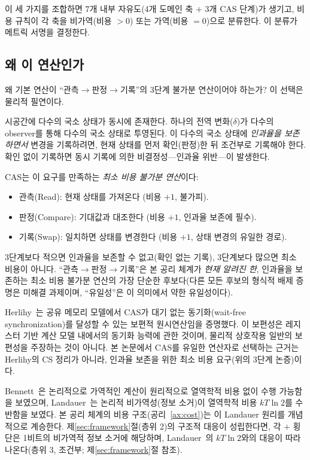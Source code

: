 \documentclass[entropy,article,submit,pdftex,oneauthor]{Definitions/mdpi}
\begin{document}
이 세 가지를 조합하면 7개 내부 자유도(4개 도메인 축 $+$ 3개 CAS 단계)가 생기고, 비용 규칙이 각 축을 비가역(비용 $> 0$) 또는 가역(비용 $= 0$)으로 분류한다. 이 분류가 메트릭 서명을 결정한다.

\subsection{왜 이 연산인가}

왜 기본 연산이 ``관측$\to$판정$\to$기록''의 3단계 불가분 연산이어야 하는가? 이 선택은 물리적 필연이다.

시공간에 다수의 국소 상태가 동시에 존재한다. 하나의 전역 변화($\delta$)가 다수의 observer를 통해 다수의 국소 상태로 투영된다. 이 다수의 국소 상태에 \emph{인과율을 보존하면서} 변경을 기록하려면, 현재 상태를 먼저 확인(판정)한 뒤 조건부로 기록해야 한다. 확인 없이 기록하면 동시 기록에 의한 비결정성---인과율 위반---이 발생한다.

CAS는 이 요구를 만족하는 \emph{최소 비용 불가분 연산}이다:
\begin{itemize}
\item 관측(Read): 현재 상태를 가져온다 (비용 $+1$, 불가피).
\item 판정(Compare): 기대값과 대조한다 (비용 $+1$, 인과율 보존에 필수).
\item 기록(Swap): 일치하면 상태를 변경한다 (비용 $+1$, 상태 변경의 유일한 경로).
\end{itemize}
3단계보다 적으면 인과율을 보존할 수 없고(확인 없는 기록), 3단계보다 많으면 최소 비용이 아니다. ``관측$\to$판정$\to$기록''은 본 공리 체계가 \emph{현재 알려진 한}, 인과율을 보존하는 최소 비용 불가분 연산의 가장 단순한 후보다(다른 모든 후보의 형식적 배제 증명은 미해결 과제이며, ``유일성''은 이 의미에서 약한 유일성이다).

Herlihy~\cite{herlihy1991}는 공유 메모리 모델에서 CAS가 대기 없는 동기화(wait-free synchronization)를 달성할 수 있는 보편적 원시연산임을 증명했다. 이 보편성은 레지스터 기반 계산 모델 내에서의 동기화 능력에 관한 것이며, 물리적 상호작용 일반의 보편성을 주장하는 것이 아니다. 본 논문에서 CAS를 유일한 연산자로 선택하는 근거는 Herlihy의 CS 정리가 아니라, 인과율 보존을 위한 최소 비용 요구(위의 3단계 논증)이다.

Bennett~\cite{bennett1973}은 논리적으로 가역적인 계산이 원리적으로 열역학적 비용 없이 수행 가능함을 보였으며, Landauer~\cite{landauer1961}는 논리적 비가역성(정보 소거)이 열역학적 비용 $kT\ln 2$를 수반함을 보였다. 본 공리 체계의 비용 구조(공리~\ref{ax:cost})는 이 Landauer 원리를 개념적으로 계승한다. 제\ref{sec:framework}절(층위 2)의 구조적 대응이 성립한다면, 각 $+$ 횡단은 1비트의 비가역적 정보 소거에 해당하며, Landauer~\cite{landauer1961}의 $kT\ln 2$와의 대응이 따라 나온다(층위 3, 조건부; 제\ref{sec:framework}절 참조).
\end{document}
